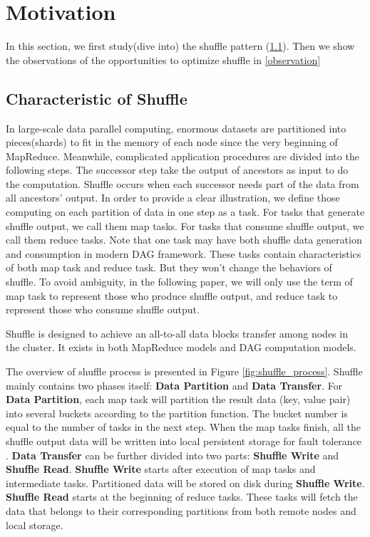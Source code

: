 \section{Motivation}

In this section, we first study(dive into) the shuffle pattern (\ref{shuffle pattern}). 
Then we show the observations of the opportunities to optimize shuffle in \ref{observation}
\subsection{Characteristic of Shuffle} \label{shuffle pattern}

In large-scale data parallel computing, enormous datasets are partitioned into pieces(shards) to fit in the memory of each node since the very beginning of MapReduce\cite{mapreduce}.
Meanwhile, complicated application procedures are divided into the following steps. The successor step take the output of ancestors as input to do the computation. Shuffle occurs when each successor needs 
part of the data from all ancestors' output. In order to provide a clear illustration, we define those computing on each partition of data in one step as a task. For tasks that generate shuffle output, we call
them map tasks. For tasks that consume shuffle output, we call them reduce tasks. Note that one task may have both shuffle data generation and consumption in modern DAG framework. These tasks contain characteristics of both map task and reduce task. But they won't change the behaviors of shuffle. To avoid ambiguity, in the following paper, we will only use the term of map task to represent those who produce shuffle output, and reduce task to represent those who consume shuffle output.

Shuffle is designed to achieve an all-to-all data blocks transfer among nodes in the cluster. It exists in both MapReduce models and DAG computation models.

The overview  of shuffle process is presented in Figure \ref{fig:shuffle_process}. Shuffle mainly contains two phases itself: \textbf{Data Partition} and \textbf{Data Transfer}. For \textbf{Data Partition}, each map task will partition the result data (key, value pair) into several buckets according to the partition function.
The bucket number is equal to the number of tasks in the next step. When the map tasks finish, all the shuffle output data will be written into local persistent storage for fault tolerance \cite{mapreduce, spark}.
\textbf{Data Transfer} can be further divided into two parts: \textbf{Shuffle Write} and \textbf{Shuffle Read}. \textbf{Shuffle Write} starts after execution of map tasks and intermediate tasks. Partitioned data will be stored on disk during \textbf{Shuffle Write}. \textbf{Shuffle Read} starts at the beginning of reduce tasks. These tasks will fetch the data that belongs to their corresponding partitions from both remote nodes and local storage.

